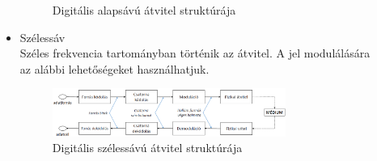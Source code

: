 \documentclass[margin=0px]{article}
\begin{document}
\begin{description}
\begin{itemize}
\begin{figure}[H]
							\caption{Digitális alapsávú átvitel struktúrája}
						\end{figure}
					\item Szélessáv \\
						Széles frekvencia tartományban történik az átvitel. A jel modulálására az alábbi lehetőségeket használhatjuk.
						\begin{figure}[H]
							\centering
							\includegraphics[width=0.8\textwidth]{img/szelessav.png}
							\caption{Digitális szélessávú átvitel struktúrája}
						\end{figure}
						

\end{itemize}
\end{description}
\end{document}
